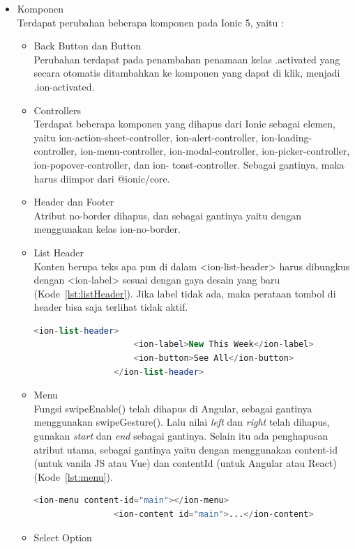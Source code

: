\begin{enumerate}
\begin{itemize}
		\item Komponen\\
		Terdapat perubahan beberapa komponen pada Ionic 5, yaitu :
		\begin{itemize}
			\item Back Button dan Button  \\
			Perubahan terdapat pada penambahan penamaan kelas .activated yang secara otomatis ditambahkan ke komponen yang dapat di klik, menjadi .ion-activated.
			\item Controllers\\
			Terdapat beberapa komponen yang dihapus dari Ionic sebagai elemen, yaitu ion-action-sheet-controller, ion-alert-controller, ion-loading-controller, ion-menu-controller, ion-modal-controller, ion-picker-controller, ion-popover-controller, dan ion- toast-controller. Sebagai gantinya, maka harus diimpor dari @ionic/core. 
			\item Header dan Footer\\
			Atribut no-border dihapus, dan sebagai gantinya yaitu dengan menggunakan kelas ion-no-border.
			\item List Header\\
			Konten berupa teks apa pun di dalam <ion-list-header> harus dibungkus dengan <ion-label> sesuai dengan gaya desain yang baru (Kode~\ref{lst:listHeader}). Jika label tidak ada, maka perataan tombol di header bisa saja terlihat tidak aktif. \newpage
			\begin{lstlisting}[language=php, label={lst:listHeader}, caption=Kode Program untuk List Header]
				<ion-list-header>
					<ion-label>New This Week</ion-label>
					<ion-button>See All</ion-button>
				</ion-list-header>
			\end{lstlisting}
			\item Menu\\
			Fungsi swipeEnable() telah dihapus di Angular, sebagai gantinya menggunakan swipeGesture(). Lalu nilai {\it left} dan {\it right} telah dihapus, gunakan {\it start} dan {\it end} sebagai gantinya. Selain itu ada penghapusan atribut utama, sebagai gantinya yaitu dengan menggunakan content-id (untuk vanila JS atau Vue) dan contentId (untuk Angular atau React) (Kode~\ref{lst:menu}).
			\begin{lstlisting}[language=php, label={lst:menu}, caption=Kode Program untuk Menu]
				<ion-menu content-id="main"></ion-menu>
				<ion-content id="main">...</ion-content>
			\end{lstlisting}
			\item Select Option \\

\end{itemize}
\end{itemize}
\end{enumerate}
